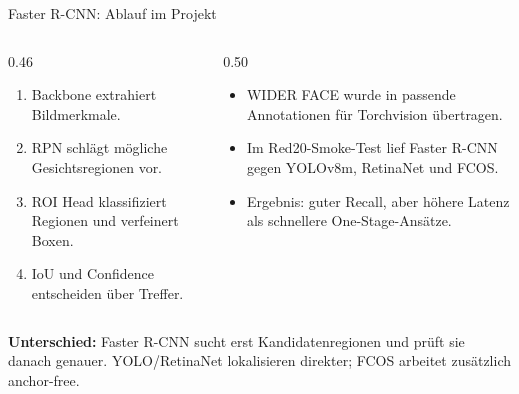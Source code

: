 \begin{frame}{Faster R-CNN: Ablauf im Projekt}
\small
\begin{columns}[T,onlytextwidth]
\begin{column}{0.46\textwidth}
\begin{enumerate}
    \item Backbone extrahiert Bildmerkmale.
    \item RPN schlägt mögliche Gesichtsregionen vor.
    \item ROI Head klassifiziert Regionen und verfeinert Boxen.
    \item IoU und Confidence entscheiden über Treffer.
\end{enumerate}
\end{column}
\begin{column}{0.50\textwidth}
\begin{itemize}
    \item WIDER FACE wurde in passende Annotationen für Torchvision übertragen.
    \item Im Red20-Smoke-Test lief Faster R-CNN gegen YOLOv8m, RetinaNet und FCOS.
    \item Ergebnis: guter Recall, aber höhere Latenz als schnellere One-Stage-Ansätze.
\end{itemize}
\end{column}
\end{columns}
\vspace{0.5em}
\scriptsize
\textbf{Unterschied:} Faster R-CNN sucht erst Kandidatenregionen und prüft sie danach genauer. YOLO/RetinaNet lokalisieren direkter; FCOS arbeitet zusätzlich anchor-free. \cite{Ren2015FasterRCNN}
\end{frame}
